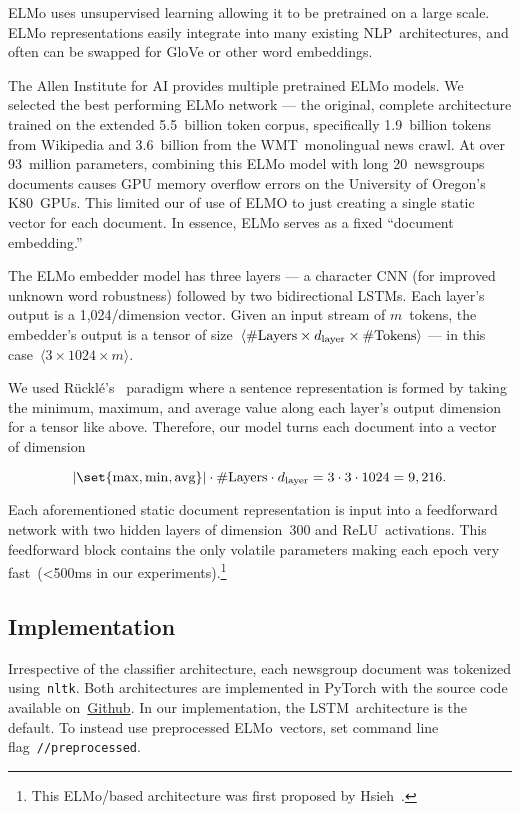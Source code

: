 ELMo uses unsupervised learning allowing it to be pretrained on a large scale.  ELMo representations easily integrate into many existing NLP~architectures, and often can be swapped for GloVe or other word embeddings.

The Allen Institute for AI provides multiple pretrained ELMo models.  We selected the best performing ELMo network --- the original, complete architecture trained on the extended 5.5~billion token corpus, specifically 1.9~billion tokens from Wikipedia and 3.6~billion from the WMT~monolingual news crawl. At over 93~million parameters, combining this ELMo model with long 20~newsgroups documents causes GPU memory overflow errors on the University of Oregon's K80~GPUs.  This limited our of use of ELMO to just creating a single static vector for each document. In essence, ELMo serves as a fixed ``document embedding.''

The ELMo embedder model has three layers --- a character CNN (for improved unknown word robustness) followed by two bidirectional LSTMs.  Each layer's output is a 1,024\-/dimension vector.  Given an input stream of $m$~tokens, the embedder's output is a tensor of size~${\langle \textnormal{\#Layers} \times d_{\textnormal{layer}} \times \textnormal{\#Tokens} \rangle}$ --- in this case~${\langle 3 \times 1024 \times m \rangle}$.

We used R\"{u}ckl\'{e}\etal's~\cite{Ruckle:2018} paradigm where a sentence representation is formed by taking the minimum, maximum, and average value along each layer's output dimension for a tensor like above. Therefore, our model turns each document into a vector of dimension

\begin{equation*}
  \abs{\set{\max,\min,\textnormal{avg}}} \cdot \textnormal{\#Layers} \cdot d_{\textnormal{layer}} = 3 \cdot 3 \cdot 1024 = 9,216\text{.}
\end{equation*}

Each aforementioned static document representation is input into a feedforward network with two hidden layers of dimension~300 and ReLU~activations. This feedforward block contains the only volatile parameters making each epoch very fast~(<500ms in our experiments).\footnote{This ELMo\-/based architecture was first proposed by Hsieh\etal~\cite{Hsieh:2018}.}

\subsection{Implementation}

Irrespective of the classifier architecture, each newsgroup document was tokenized using~\texttt{nltk}. Both architectures are implemented in PyTorch with the source code available on~\href{\sourceCode}{Github}.  In our implementation, the LSTM~architecture is the default. To instead use preprocessed ELMo~vectors, set command line flag~\texttt{\mbox{\-/\-/preprocessed}}.
